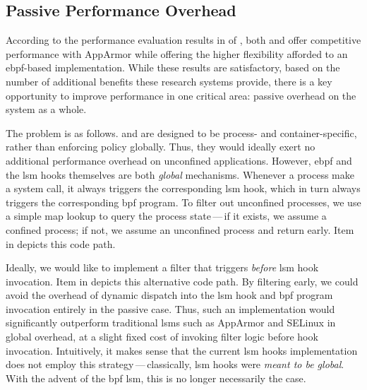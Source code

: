 \subsection{Passive Performance Overhead}

According to the performance evaluation results in  of
, both \bpfbox{} and \bpfcontain{} offer competitive performance with
AppArmor while offering the higher flexibility afforded to an \gls{ebpf}-based
implementation. While these results are satisfactory, based on the number of additional
benefits these research systems provide, there is a key opportunity to improve performance
in one critical area: passive overhead on the system as a whole. 

The problem is as follows. \bpfbox{} and \bpfcontain{} are designed to be process- and
container-specific, rather than enforcing policy globally. Thus, they would ideally exert
no additional performance overhead on unconfined applications. However, \gls{ebpf} and the
\gls{lsm} hooks themselves are both \textit{global} mechanisms. Whenever a process make
a system call, it always triggers the corresponding \gls{lsm} hook, which in turn always
triggers the corresponding \gls{bpf} program. To filter out unconfined processes, we use
a simple map lookup to query the process state\,---\,if it exists, we assume a confined
process; if not, we assume an unconfined process and return early. Item  in
 depicts this code path.

Ideally, we would like to implement a filter that triggers \textit{before} \gls{lsm} hook
invocation. Item  in  depicts this alternative code path.
By filtering early, we could avoid the overhead of dynamic dispatch into the \gls{lsm}
hook and \gls{bpf} program invocation entirely in the passive case. Thus, such an
implementation would significantly outperform traditional \glspl{lsm} such as AppArmor and
SELinux in global overhead, at a slight fixed cost of invoking filter logic before hook
invocation.  Intuitively, it makes sense that the current \gls{lsm} hooks implementation does
not employ this strategy\,---\,classically, \gls{lsm} hooks were \textit{meant to be global}.
With the advent of the \gls{bpf} \gls{lsm}, this is no longer necessarily the case.

